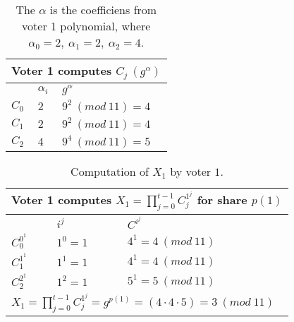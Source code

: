 \begin{table}[H]
\centering
\begin{tabular}{|l|l|l|}
\hline
\multicolumn{3}{|l|}{\textbf{Voter 1 computes $C_j \ (g^{\alpha})$}} \\ \hline
              & $ \alpha_i $        & $g^{ \alpha }$              \\ \hline
$C_0$          & $2$               & $9^2 \ (mod \ 11) = 4$          \\ \hline
$C_1$          & $2$               & $9^2 \ (mod \ 11) = 4$          \\ \hline
$C_2$          & $4$               & $9^4 \ (mod \ 11) = 5$          \\ \hline
\end{tabular}
\caption{The $\alpha$ is the coefficiens from voter 1 polynomial, where $\alpha_0=2, \ \alpha_1= 2, \ \alpha_2= 4$. }
\label{my-label}
\end{table}

\begin{table}[H]
\centering
\begin{tabular}{|l|l|l|}
\hline
\multicolumn{3}{|l|}{\textbf{Voter 1 computes $X_1 =\prod\limits_{j=0}^{t-1} C_j^{1^j}$  for share $p(1)$ }}          \\ \hline
                                                         & $i^j$              & $C^{i^{j}}$          \\ \hline
$C^{0^{1}}_0$           & $1^{0} = 1$          & $4^{1} = 4 \ (mod \ 11)$                   \\ \hline
$C^{1^{1}}_1$           & $1^{1} = 1$          & $4^{1} = 4 \ (mod \ 11)$                   \\ \hline
$C^{2^{1}}_2$           & $1^{2} = 1$          & $5^{1} = 5 \ (mod \ 11)$                   \\ \hline
\multicolumn{3}{|l|}{$X_1 =\prod\limits_{j=0}^{t-1} C_j^{1^j} = g^{p(1)} = (4 \cdot 4 \cdot 5) = 3 \ (mod \ 11)$} \\ \hline
\end{tabular}
\caption{Computation of $X_1$ by voter $1$. }
\label{my-label}
\end{table}


